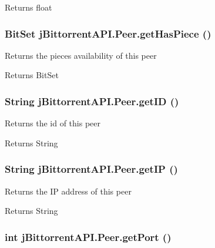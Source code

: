\begin{DoxyReturn}{Returns}
float 
\end{DoxyReturn}
\hypertarget{classj_bittorrent_a_p_i_1_1_peer_a8161bb02d7e8a626606fc1f48720167e}{
\subsubsection[{getHasPiece}]{\setlength{\rightskip}{0pt plus 5cm}BitSet jBittorrentAPI.Peer.getHasPiece ()}}
\label{classj_bittorrent_a_p_i_1_1_peer_a8161bb02d7e8a626606fc1f48720167e}
Returns the pieces availability of this peer \begin{DoxyReturn}{Returns}
BitSet 
\end{DoxyReturn}
\hypertarget{classj_bittorrent_a_p_i_1_1_peer_a3c000bc04c36f38849de8f24c1c1ca4b}{
\subsubsection[{getID}]{\setlength{\rightskip}{0pt plus 5cm}String jBittorrentAPI.Peer.getID ()}}
\label{classj_bittorrent_a_p_i_1_1_peer_a3c000bc04c36f38849de8f24c1c1ca4b}
Returns the id of this peer \begin{DoxyReturn}{Returns}
String 
\end{DoxyReturn}
\hypertarget{classj_bittorrent_a_p_i_1_1_peer_a45433671f97727829f59f7f215fd04ec}{
\subsubsection[{getIP}]{\setlength{\rightskip}{0pt plus 5cm}String jBittorrentAPI.Peer.getIP ()}}
\label{classj_bittorrent_a_p_i_1_1_peer_a45433671f97727829f59f7f215fd04ec}
Returns the IP address of this peer \begin{DoxyReturn}{Returns}
String 
\end{DoxyReturn}
\hypertarget{classj_bittorrent_a_p_i_1_1_peer_a8d9e796f58c6c0083ff7336986af72f6}{
\subsubsection[{getPort}]{\setlength{\rightskip}{0pt plus 5cm}int jBittorrentAPI.Peer.getPort ()}}
